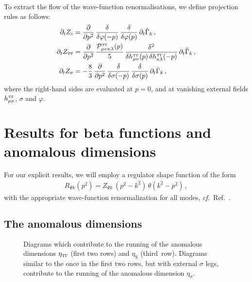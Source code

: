 \documentclass[11pt]{book} %
\newcommand\TTspace{ -1pt }
\newcommand\TT{ \scriptscriptstyle{\mathrm{T\hspace{\TTspace}T}} }
\newcommand\hTTmunu{ h^{\scriptscriptstyle{\mathrm{T\hspace{\TTspace}T}}}_{\mu\nu} }
\newcommand\etaTT{ \eta_{\scriptscriptstyle{\mathrm{T\hspace{\TTspace}T}}} }
\newcommand\ZTT{ Z_{\scriptscriptstyle{\mathrm{T\hspace{\TTspace}T}}} }
\newcommand\etaS{ \eta_{\scriptscriptstyle{\mathrm{S}}} }
\newcommand\ZS{ Z_{\scriptscriptstyle{\mathrm{S}}} }
\newcommand\cf{\textit{cf.}\ }
\numberwithin{equation}{chapter}
\begin{document}
To extract the flow of the wave-function renormalisations, we define projection rules as follows:
\begin{align}
  \partial_t \ZS &=
  \frac{\partial}{\partial p^2} \, \frac{\delta}{\delta \varphi(-p)} \, \frac{\delta}{\delta \varphi(p)} \, \partial_t \hat \Gamma_k \,, \\
  \partial_t \ZTT &=
  \frac{\partial}{\partial p^2}  \, \frac{\mathcal P^{\TT}_{\mu \nu\kappa\lambda}(p)}{5}  \, \frac{\delta^2}{\delta \hTTmunu (p) \, \delta h^{\TT}_{\kappa \lambda}(-p)} \, \partial_t \hat \Gamma_k \,, \\
  \partial_t Z_{\sigma} &= -\frac{8}{3} \,
  \frac{\partial}{\partial p^2} \, \frac{\delta}{\delta \sigma(-p)} \, \frac{\delta}{\delta \sigma(p)} \, \partial_t \hat \Gamma_k \,,
\end{align}
where the right-hand sides are evaluated at $p=0$,
and at vanishing external fields $\hTTmunu$, $\sigma$ and $\varphi$.


\section{Results for beta functions and anomalous dimensions}

For our explicit results, we will employ a regulator shape function of the form
\begin{align}
  \nonumber
  R_{\Psi k} \left( p^2\right) = Z_{\Psi k} \, (p^2-k^2) \, \theta(k^2-p^2) \,,
\end{align}
with the appropriate wave-function renormalization for all modes, \cf Ref.~\cite{Litim:2001up}.


\subsection{The anomalous dimensions}

\begin{figure}[p]
  \begin{center}
    
  \end{center}
  \caption{
    Diagrams which contribute to the running of the anomalous dimensions
    $\etaTT$ (first two rows) and $\etaS$ (third~row).
    Diagrams similar to the once in the first two rows, but with external $\sigma$ legs,
    contribute to the running of the anomalous dimension $\eta_{\sigma}$.
  }
  \label{fig:eta-diagrams-ch4}
\end{figure}
\end{document}
